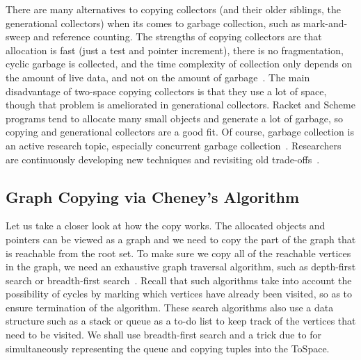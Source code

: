 \documentclass[11pt]{book}
\begin{document}
There are many alternatives to copying collectors (and their older
siblings, the generational collectors) when its comes to garbage
collection, such as mark-and-sweep and reference counting.  The
strengths of copying collectors are that allocation is fast (just a
test and pointer increment), there is no fragmentation, cyclic garbage
is collected, and the time complexity of collection only depends on
the amount of live data, and not on the amount of
garbage~\citep{Wilson:1992fk}. The main disadvantage of two-space
copying collectors is that they use a lot of space, though that
problem is ameliorated in generational collectors.  Racket and Scheme
programs tend to allocate many small objects and generate a lot of
garbage, so copying and generational collectors are a good fit.  Of
course, garbage collection is an active research topic, especially
concurrent garbage collection~\citep{Tene:2011kx}. Researchers are
continuously developing new techniques and revisiting old
trade-offs~\citep{Blackburn:2004aa,Jones:2011aa,Shahriyar:2013aa,Cutler:2015aa,Shidal:2015aa}.

\subsection{Graph Copying via Cheney's Algorithm}
\label{sec:cheney}

Let us take a closer look at how the copy works. The allocated objects
and pointers can be viewed as a graph and we need to copy the part of
the graph that is reachable from the root set. To make sure we copy
all of the reachable vertices in the graph, we need an exhaustive
graph traversal algorithm, such as depth-first search or breadth-first
search~\citep{Moore:1959aa,Cormen:2001uq}. Recall that such algorithms
take into account the possibility of cycles by marking which vertices
have already been visited, so as to ensure termination of the
algorithm. These search algorithms also use a data structure such as a
stack or queue as a to-do list to keep track of the vertices that need
to be visited. We shall use breadth-first search and a trick due to
\citet{Cheney:1970aa} for simultaneously representing the queue and
copying tuples into the ToSpace.
\end{document}
